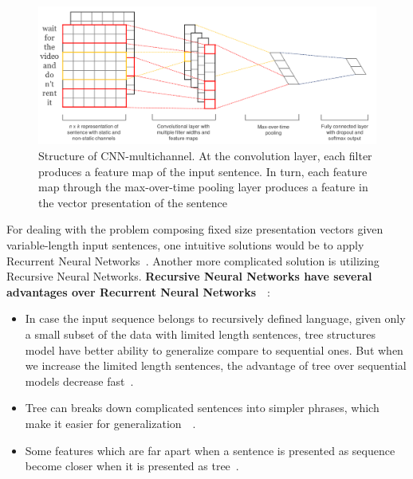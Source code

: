 \begin{figure}[H]
    \centering
    \includegraphics[scale=0.33]{figure/sentencecnn}
    \caption[CNN-multichannel]{Structure of CNN-multichannel. 
    At the convolution layer, each filter produces a feature map of the input sentence. 
    In turn, each feature map through the max-over-time pooling layer produces a feature in the vector presentation of the sentence}
    \label{fig:CNN-multichannel}
\end{figure}

For dealing with the problem composing fixed size presentation vectors given variable-length input sentences, one intuitive solutions would be to apply Recurrent Neural Networks~\cite{cnn-rnn}.
Another more complicated solution is utilizing Recursive Neural Networks.
\textbf{Recursive Neural Networks have several advantages over Recurrent Neural Networks}~\cite{need-tree}~\cite{bowman-treevslstm}: 
\begin{itemize}
\item In case the input sequence belongs to recursively defined language, given only a small subset of the data with limited length sentences, tree structures model have better ability to generalize compare to sequential ones.
But when we increase the limited length sentences, the advantage of tree over sequential models decrease fast~\cite{bowman-treevslstm}. 
\item Tree can breaks down complicated sentences into simpler phrases, which make it easier for generalization~\cite{knowledge-matter}~\cite{need-tree}.
\item Some features which are far apart when a sentence is presented as sequence become closer when it is presented as tree~\cite{need-tree}.
\end{itemize}

